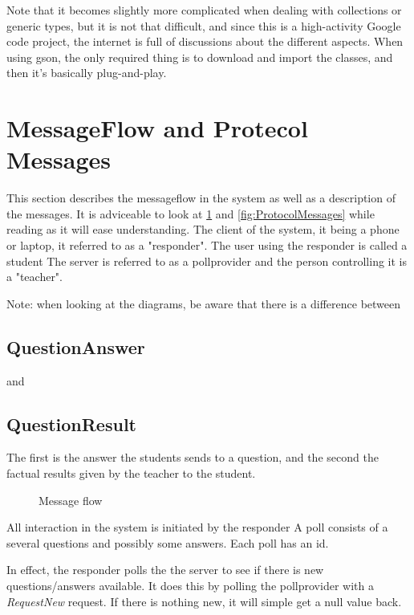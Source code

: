 \documentclass{acm_proc_article-sp}
\begin{document}
Note that it becomes slightly more complicated when dealing with collections or generic types, but it is not that difficult, and since this is a high-activity Google code project, the internet is full of discussions about the different aspects. When using gson, the only required thing is to download and import the classes, and then it's basically plug-and-play.

\balancecolumns
 
\section{MessageFlow and Protecol Messages} 
\thispagestyle{fancy}%

This section describes the messageflow in the system as well as a description of the messages.
It is adviceable to look at \ref{fig:Messageflow} and \ref{fig:ProtocolMessages} while reading as it will ease understanding.
The client of the system, it being a phone or laptop, it referred to as a "responder". The user using the responder is called a student
The server is referred to as a pollprovider and the person controlling it is a "teacher".

Note: when looking at the diagrams, be aware that there is a difference between \subsection{QuestionAnswer} and \subsection{QuestionResult}
The first is the answer the students sends to a question, and the second the factual results given by the teacher to the student. 

\begin{figure}[h]
\centering
{}
\caption{Message flow}
\label{fig:Messageflow}
\end{figure}


All interaction in the system is initiated by the responder
A poll consists of a several questions and possibly some answers. Each poll has an id.

In effect, the responder polls the the server to see if there is new questions/answers available.
It does this by polling the pollprovider with a \emph{RequestNew} request. If there is nothing new, it will simple get a null value back.
\end{document}
